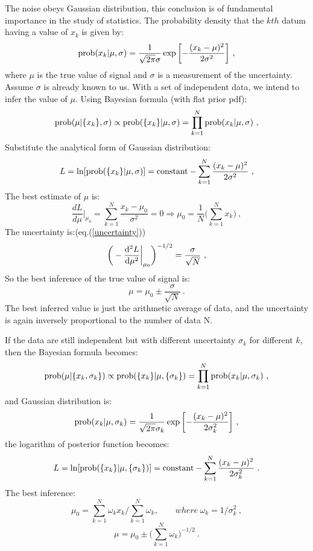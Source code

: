 \documentclass[11pt, a4paper]{article}
\begin{document}
The noise obeys Gaussian distribution, this conclusion is of fundamental importance in the study of statistics. The probability density that the $kth$ datum having a value of $x_k$ is given by:
\begin{equation}
{\rm prob}(x_k|\mu,\sigma)=\frac{1}{\sqrt{2\pi}\sigma}\exp\bigg[{-\frac{(x_k-\mu)^2}{2\sigma^2}}\bigg]~,
\end{equation}
where $\mu$ is the true value of signal and $\sigma$ is a measurement of the uncertainty. Assume $\sigma$ is already known to us. With a set of independent data, we intend to infer the value of $\mu$. Using Bayesian formula (with flat prior pdf):
\begin{equation}
{\rm prob}(\mu|\{x_k\},\sigma)\propto {\rm prob}(\{x_k\}|\mu,\sigma)=\prod_{k=1}^N{\rm prob}(x_k|\mu,\sigma)~,
\end{equation}
Substitute the analytical form of Gaussian distribution:
\begin{equation}
L=\ln [{\rm prob}(\{x_k\}|\mu,\sigma)]={\rm constant}-\sum_{k=1}^N\frac{(x_k-\mu)^2}{2\sigma^2}~,
\end{equation}
The best estimate of $\mu$ is:
\begin{equation}
\frac{dL}{d\mu}\bigg|_{\mu_0}=\sum_{k=1}^N\frac{x_k-\mu_0}{\sigma^2}=0\Rightarrow\mu_0=\frac{1}{N}\bigg(\sum_{k=1}^N x_k\bigg)~,
\end{equation}
The uncertainty is:(eq.(\ref{uncertainty}))
\begin{equation}
\bigg(-\frac{{\rm d}^2L}{{\rm d}\mu^2}\bigg|_{\mu_0}\bigg)^{-1/2}=\frac{\sigma}{\sqrt N}~,
\end{equation}
So the best inference of the true value of signal is:
\begin{equation}
\mu=\mu_0\pm\frac{\sigma}{\sqrt N}~.
\end{equation}
The best inferred value is just the arithmetic average of data, and the uncertainty is again inversely proportional to the number of data N.

If the data are still independent but with different uncertainty $\sigma_k$ for different $k$, then the Bayesian formula becomes:
\begin{equation}
{\rm prob}(\mu|\{x_k,\sigma_k\})\propto {\rm prob}(\{x_k\}|\mu,\{\sigma_k\})=\prod_{k=1}^N{\rm prob}(x_k|\mu,\sigma_k)~,
\end{equation}
and Gaussian distribution is:
\begin{equation}
{\rm prob}(x_k|\mu,\sigma_k)=\frac{1}{\sqrt{2\pi}\sigma_k}\exp\bigg[{-\frac{(x_k-\mu)^2}{2\sigma_k^2}}\bigg]~,
\end{equation}
the logarithm of posterior function becomes:
\begin{equation}
L=\ln [{\rm prob}(\{x_k\}|\mu,\{\sigma_k\})]={\rm constant}-\sum_{k=1}^N\frac{(x_k-\mu)^2}{2\sigma_k^2}~.
\end{equation}
The best inference:
\begin{equation}
\mu_0=\sum_{k=1}^N \omega_k x_k\bigg/ \sum_{k=1}^N \omega_k, \qquad where~\omega_k=1/\sigma_k^2~,
\end{equation}
\begin{equation}
\mu=\mu_0\pm\bigg(\sum_{k=1}^N \omega_k \bigg)^{-1/2}~.
\end{equation}
\end{document}
